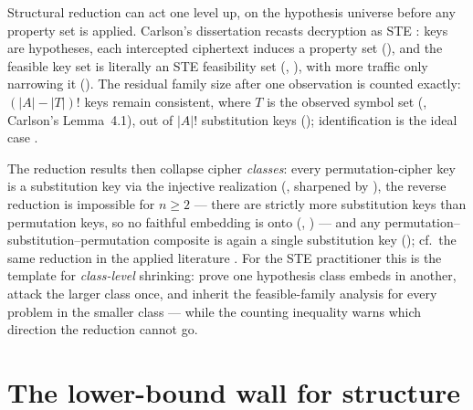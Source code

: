 \documentclass[11pt]{article}
\begin{document}
Structural reduction can act one level up, on the hypothesis universe
before any property set is applied.  Carlson's dissertation recasts
decryption as STE \citep{carlson2012}: keys are hypotheses, each
intercepted ciphertext induces a property set
(), and the feasible key set is literally an STE
feasibility set (, ), with
more traffic only narrowing it ().  The
residual family size after one observation is counted exactly:
$(|A|-|T|)!$ keys remain consistent, where $T$ is the observed symbol
set (, Carlson's Lemma~4.1), out of $|A|!$
substitution keys (); identification is
the ideal case .

The reduction results then collapse cipher \emph{classes}: every
permutation-cipher key is a substitution key via the injective
realization 
(, sharpened by
), the reverse reduction is impossible for
$n\ge 2$ --- there are strictly more substitution keys than
permutation keys, so no faithful embedding is onto
(,
) --- and any
permutation--substitution--permutation composite is again a single
substitution key (); cf.\ the same
reduction in the applied literature
\citep{ghosh2021isomorphic,carlson2022equivalence}.  For the STE
practitioner this is the template for \emph{class-level} shrinking:
prove one hypothesis class embeds in another, attack the larger class
once, and inherit the feasible-family analysis for every problem in the
smaller class --- while the counting inequality warns which direction
the reduction cannot go.

\section{The lower-bound wall for structure}
\label{sec:lowerbound}
\end{document}
